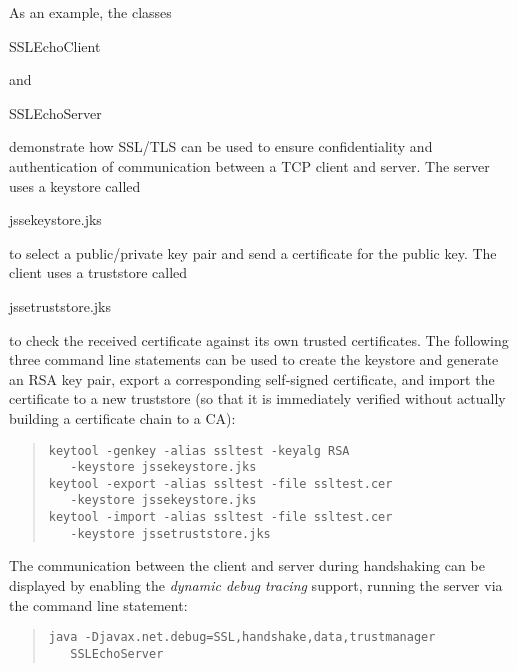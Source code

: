 As an example, the classes \begin{code}SSLEchoClient\end{code} and
\begin{code}SSLEchoServer\end{code} demonstrate how SSL/TLS can be used
to ensure confidentiality and authentication of communication between a
TCP client and server.
The server uses a keystore called \begin{code}jssekeystore.jks\end{code}
to select a public/private key pair and send a certificate for the public key.
The client uses a truststore called \begin{code}jssetruststore.jks\end{code}
to check the received certificate against its own trusted certificates.
The following three command line statements can be used to create the keystore and
generate an RSA key pair, export a corresponding self-signed certificate,
and import the certificate to a new truststore
(so that it is immediately verified without actually building a certificate chain
to a CA):
\begin{quote}\begin{code}\begin{verbatim}
keytool -genkey -alias ssltest -keyalg RSA
   -keystore jssekeystore.jks
keytool -export -alias ssltest -file ssltest.cer
   -keystore jssekeystore.jks
keytool -import -alias ssltest -file ssltest.cer
   -keystore jssetruststore.jks
\end{verbatim}\end{code}\end{quote}
The communication between the client and server during handshaking can be displayed by
enabling the \emph{dynamic debug tracing} support, running the server via the
command line statement:
\begin{quote}\begin{code}\begin{verbatim}
java -Djavax.net.debug=SSL,handshake,data,trustmanager
   SSLEchoServer
\end{verbatim}\end{code}\end{quote}

